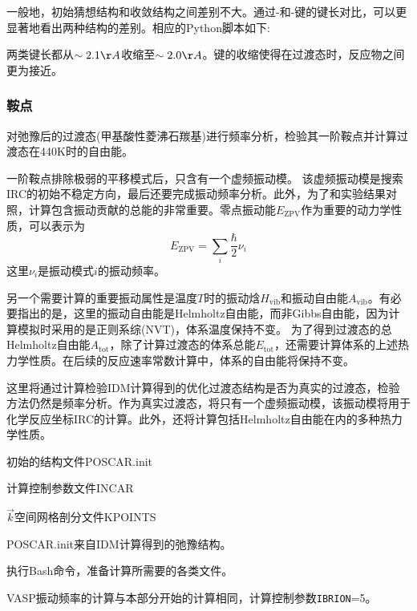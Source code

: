 一般地，初始猜想结构和收敛结构之间差别不大。通过-和-键的键长对比，可以更显著地看出两种结构的差别。相应的\textrm{Python}脚本如下:

两类键长都从$\sim2.1\AA$收缩至$\sim2.0\AA$。键的收缩使得在过渡态时，反应物之间更为接近。


\subsubsection{鞍点}
对弛豫后的过渡态(甲基酸性菱沸石羰基)进行频率分析，检验其一阶鞍点并计算过渡态在\textrm{440K}时的自由能。

一阶鞍点排除极弱的平移模式后，只含有一个虚频振动模。 该虚频振动模是搜索\textrm{IRC}的初始不稳定方向，最后还要完成振动频率分析。此外，为了和实验结果对照，计算包含振动贡献的总能的非常重要。零点振动能$E_{\mathrm{ZPV}}$作为重要的动力学性质，可以表示为
\begin{displaymath}
	E_{\mathrm{ZPV}}=\sum_i\dfrac{\hbar}2\nu_i
\end{displaymath}
这里$\nu_i$是振动模式$i$的振动频率。

另一个需要计算的重要振动属性是温度$T$时的振动焓$H_{\mathrm{vib}}$和振动自由能$A_{\mathrm{vib}}$。有必要指出的是，这里的振动自由能是\textrm{Helmholtz}自由能，而非\textrm{Gibbs}自由能，因为计算模拟时采用的是正则系综\textrm{(NVT)}，体系温度保持不变。%
为了得到过渡态的总\textrm{Helmholtz}自由能$A_{\mathrm{tot}}$，除了计算过渡态的体系总能$E_{\mathrm{tot}}$，还需要计算体系的上述热力学性质。在后续的反应速率常数计算中，体系的自由能将保持不变。

这里将通过计算检验\textrm{IDM}计算得到的优化过渡态结构是否为真实的过渡态，检验方法仍然是频率分析。作为真实过渡态，将只有一个虚频振动模，该振动模将用于化学反应坐标\textrm{IRC}的计算。此外，还将计算包括\textrm{Helmholtz}自由能在内的多种热力学性质。

初始的结构文件\textrm{POSCAR.init}

计算控制参数文件\textrm{INCAR}

$\vec k$空间网格剖分文件\textrm{KPOINTS}

\textrm{POSCAR.init}来自\textrm{IDM}计算得到的弛豫结构。

执行\textrm{Bash}命令，准备计算所需要的各类文件。

\textrm{VASP}振动频率的计算与本部分开始的计算相同，计算控制参数\texttt{IBRION}=5。

